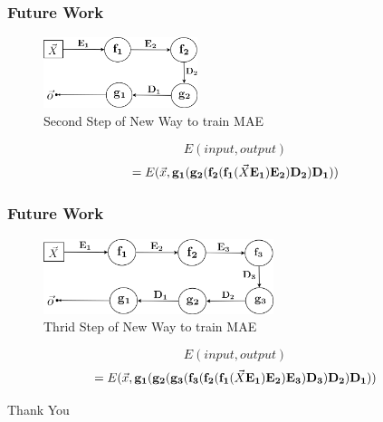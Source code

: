 \documentclass{beamer}
\begin{document}
\begin{frame}
\frametitle{Future Work}
\begin{figure}[t!]
    \centering
    \includegraphics[width=0.4\textwidth]{../paper/pictures/figures/train_new_MAE2.png}
    \caption{Second Step of New Way to train MAE}
    \label{fig:train_NMAE2}
\end{figure}

$$E(input, output)$$
$$=E(\vec{x}, \bold{g_1}(\bold{g_2}(\bold{f_2}(\bold{f_1}(\vec{X}\bold{E_1})\bold{E_2})\bold{D_2})\bold{D_1}))$$
\end{frame}

\begin{frame}
\frametitle{Future Work}
\begin{figure}[t!]
    \centering
    \includegraphics[width=0.6\textwidth]{../paper/pictures/figures/train_new_MAE3.png}
    \caption{Thrid Step of New Way to train MAE}
    \label{fig:train_NMAE3}
\end{figure}

$$E(input, output)$$
$$=E(\vec{x}, \bold{g_1}(\bold{g_2}(\bold{g_3}(\bold{f_3}(\bold{f_2}(\bold{f_1}(\vec{X}\bold{E_1})\bold{E_2})\bold{E_3})\bold{D_3})\bold{D_2})\bold{D_1}))$$
\end{frame}

\begin{frame}
\begin{center} 
\Huge Thank You 
\end{center} 
\end{frame}


%
%
\end{document}

